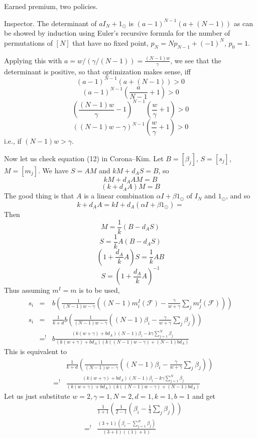 \begin{example}{Earned premium, two policies.}
\begin{example}{Inspector.}
		The determinant of $aI_N+1_{\odot}$ is $(a-1)^{N-1}(a+(N-1))$ as can be showed by induction using Euler's recursive formula for
		the number of permutations of $[N]$ that have no fixed point, $p_N= N p_{N-1} + (-1)^{N}$, $p_0=1$.

		Applying this with $a=w/(\gamma/(N-1))=\frac{(N-1)w}{\gamma}$, we see that the determinant is positive, so that optimization makes sense, iff
		\[
			(a-1)^{N-1}(a+(N-1)) >0
		\]
		\[
			\left(a-1\right)^{N-1}\left(\frac{a}{N-1}+1\right) >0
		\]
		\[
			\left(\frac{(N-1)w}{\gamma}-1\right)^{N-1}\left(\frac{w}{\gamma}+1\right) >0
		\]
		\[
			\left((N-1)w-\gamma\right)^{N-1}\left(\frac{w}{\gamma}+1\right) >0
		\]
		i.e., if $(N-1)w>\gamma$.
	\end{example}
	Now let us check equation (12) in Corona--Kim.
	Let $B=[\beta_j]$, $S=[s_j]$, $M=[m_j]$.
	We have $S=A M$ and $kM +d_A S = B$, so
	\[
		kM + d_A AM = B
	\]
	\[
		(k+d_A A)M=B
	\]
	The good thing is that $A$ is a linear combination $\alpha I+\beta 1_{\odot}$ of $I_N$ and $1_{\odot}$, and so
	\[
		 k+d_A A = kI + d_A(\alpha I+\beta 1_{\odot}) =  
	\]
	Then
	\[
		M = \frac1k (B-d_A S)
	\]
	\[
		S = \frac1k A (B - d_A S)
	\]
	\[
		(1+\frac{d_A}kA)S = \frac1k A B
	\]
	\[
		S = (1+\frac{d_A}k A)^{-1}
	\]
	Thus assuming $m^I=m$ is to be used,
	\begin{eqnarray*}
			s_i
			  &=& b \left(\frac{1}{(N-1)w-\gamma}\left((N-1)m^I_i(\mathscr F) - \frac{\gamma}{w+\gamma}\sum_j m^I_j(\mathscr F)\right)\right)\\
			s_i  &=& \frac1{k+d}b \left(\frac{1}{(N-1)w-\gamma}\left((N-1)\beta_i - \frac{\gamma}{w+\gamma}\sum_j \beta_j\right)\right)\\
			&=^!& b\frac{(k(w+\gamma)+bd_A)(N-1)\beta_i - k\gamma\sum_{j=1}^N\beta_j}{(k(w+\gamma)+bd_A)(k((N-1)w-\gamma)+(N-1)bd_A)}
	\end{eqnarray*}
	This is equivalent to
	\begin{eqnarray*}
			&&\frac1{k+d} \left(\frac{1}{(N-1)w-\gamma}\left((N-1)\beta_i - \frac{\gamma}{w+\gamma}\sum_j \beta_j\right)\right)\\
			&=^!& \frac{(k(w+\gamma)+bd_A)(N-1)\beta_i - k\gamma\sum_{j=1}^N\beta_j}{(k(w+\gamma)+bd_A)(k((N-1)w-\gamma)+(N-1)bd_A)}
	\end{eqnarray*}
	Let us just substitute $w=2,\gamma=1,N=2,d=1,k=1,b=1$ and get
	\begin{eqnarray*}
			&&\frac1{1+1} \left(\frac{1}{2-1}\left(\beta_i - \frac{1}{3}\sum_j \beta_j\right)\right)\\
			&=^!& \frac{(3+1)(\beta_i - \sum_{j=1}^N\beta_j)}{(3+1)((1)+1)}
	\end{eqnarray*}

\end{example}